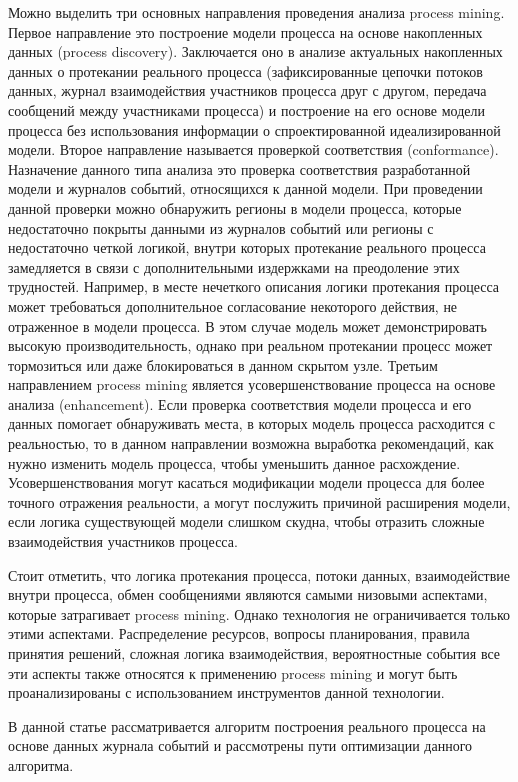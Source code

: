 \documentclass[
11pt,%
tightenlines,%
twoside,%
onecolumn,%
nofloats,%
nobibnotes,%
nofootinbib,%
superscriptaddress,%
noshowpacs,%
centertags]%
{revtex4}
\begin{document}
Можно выделить три основных направления проведения анализа process mining.
Первое направление это построение модели процесса на основе накопленных данных (process discovery).
Заключается оно в анализе актуальных накопленных данных о протекании реального процесса (зафиксированные цепочки потоков данных, журнал взаимодействия участников процесса друг с другом, передача сообщений между участниками процесса) и построение на его основе модели процесса без использования информации о спроектированной идеализированной модели.
Второе направление называется проверкой соответствия (conformance).
Назначение данного типа анализа это проверка соответствия разработанной модели и журналов событий, относящихся к данной модели.
При проведении данной проверки можно обнаружить регионы в модели процесса, которые недостаточно покрыты данными из журналов событий или регионы с недостаточно четкой логикой, внутри которых протекание реального процесса замедляется в связи с дополнительными издержками на преодоление этих трудностей.
Например, в месте нечеткого описания логики протекания процесса может требоваться дополнительное согласование некоторого действия, не отраженное в модели процесса.
В этом случае модель может демонстрировать высокую производительность, однако при реальном протекании процесс может тормозиться или даже блокироваться в данном скрытом узле.
Третьим направлением process mining является усовершенствование процесса на основе анализа (enhancement).
Если проверка соответствия модели процесса и его данных помогает обнаруживать места, в которых модель процесса расходится с реальностью, то в данном направлении возможна выработка рекомендаций, как нужно изменить модель процесса, чтобы уменьшить данное расхождение.
Усовершенствования могут касаться модификации модели процесса для более точного отражения реальности, а могут послужить причиной расширения модели, если логика существующей модели слишком скудна, чтобы отразить сложные взаимодействия участников процесса.

Стоит отметить, что логика протекания процесса, потоки данных, взаимодействие внутри процесса, обмен сообщениями являются самыми низовыми аспектами, которые затрагивает process mining.
Однако технология не ограничивается только этими аспектами.
Распределение ресурсов, вопросы планирования, правила принятия решений, сложная логика взаимодействия, вероятностные события все эти аспекты также относятся к применению process mining и могут быть проанализированы с использованием инструментов данной технологии.

В данной статье рассматривается алгоритм построения реального процесса на основе данных журнала событий и рассмотрены пути оптимизации данного алгоритма.
\end{document}
